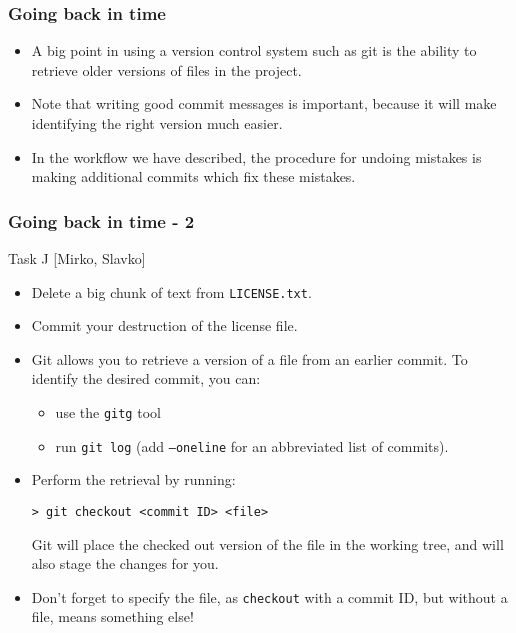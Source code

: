 

\begin{frame}

\frametitle{Going back in time}

	\begin{itemize}	
	\item A big point in using a version control system such as git is the ability to retrieve older versions of files in the project. 
	\item Note that writing good commit messages is important, because it will make identifying the right version much easier.
	\item In the workflow we have described, the procedure for undoing mistakes is making additional commits which fix these mistakes.
	\end{itemize}
\end{frame}


\begin{frame}[fragile]

\frametitle{Going back in time - 2}

	\begin{block}{Task J [Mirko, Slavko]}	
	\begin{itemize}	
	\item Delete a big chunk of text from \texttt{LICENSE.txt}.
	\item Commit your destruction of the license file.
	\item Git allows you to retrieve a version of a file from an earlier commit. To identify the desired commit, you can:
	\begin{itemize}
	\item use the \texttt{gitg} tool
	\item run \texttt{git log} (add \texttt{--oneline} for an abbreviated list of commits). 
	\end{itemize}
	\item Perform the retrieval by running:
	\begin{verbatim}
> git checkout <commit ID> <file>
	\end{verbatim}
	Git will place the checked out version of the file in the working tree, and will also stage the changes for you.
	\item Don't forget to specify the file, as \texttt{checkout} with a commit ID, but without a file, means something else!
	\end{itemize}	
	
	\end{block}
\end{frame}

